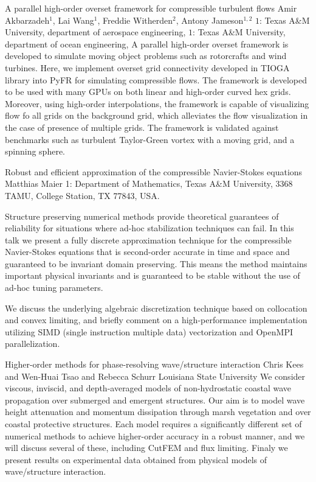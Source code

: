 \vspace{1.5ex}
\abs
{A parallel high-order overset framework for compressible turbulent flows}
{Amir Akbarzadeh$^1$, Lai Wang$^1$, Freddie Witherden$^2$, Antony Jameson$^{1,2}$}
{$1$: Texas A\&M University, department of aerospace engineering, $1$: Texas A\&M University, department of ocean engineering,}
{A parallel high-order overset framework is developed to simulate moving object problems such as rotorcrafts and wind turbines. Here, we implement overset grid connectivity developed in TIOGA library into PyFR for simulating compressible flows. The framework is developed to be used with many GPUs on both linear and high-order curved hex grids. Moreover, using high-order interpolations, the framework is capable of visualizing flow fo all grids on the background grid, which alleviates the flow visualization in the case of presence of multiple grids. The framework is validated against benchmarks such as turbulent Taylor-Green vortex with a moving grid, and a spinning sphere.}


\vspace{1.5ex}
\abs
{Robust and efficient approximation of the compressible Navier-Stokes equations}
{Matthias Maier}
{1: Department of Mathematics, Texas A\&M University, 3368
	TAMU, College Station, TX 77843, USA.}
{
	Structure preserving numerical methods provide theoretical guarantees of
	reliability for situations where ad-hoc stabilization techniques can fail.
	In this talk we present a fully discrete approximation technique for the
	compressible Navier-Stokes equations that is second-order accurate in
	time and space and guaranteed to be invariant domain preserving. This
	means the method maintains important physical invariants and is
	guaranteed to be stable without the use of ad-hoc tuning parameters.
	
	We discuss the underlying algebraic discretization technique based on
	collocation and convex limiting, and briefly comment on a high-performance
	implementation utilizing SIMD (single instruction multiple data)
	vectorization and OpenMPI parallelization.
}


\vspace{1.5ex}
\abs
{Higher-order methods for phase-resolving wave/structure interaction}
{Chris Kees and Wen-Huai Tsao and Rebecca Schurr}
{Louisiana State University}
{We consider viscous, inviscid, and depth-averaged models of
	non-hydrostatic coastal wave propagation over submerged and emergent
	structures. Our aim is to model wave height attenuation and momentum
	dissipation through marsh vegetation and over coastal protective
	structures. Each model requires a significantly different set of
	numerical methods to achieve higher-order accuracy in a robust manner,
	and we will discuss several of these, including CutFEM and flux
	limiting. Finaly we present results on experimental data obtained from
	physical models of wave/structure interaction.}